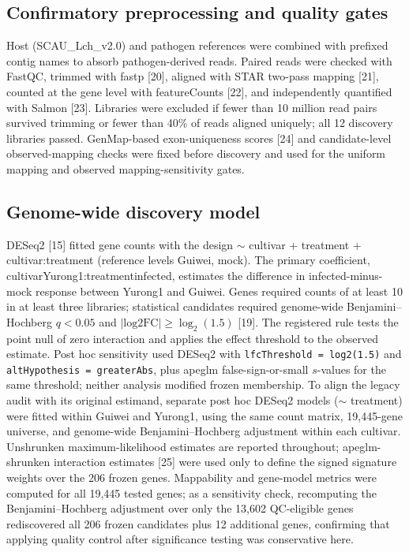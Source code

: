 \documentclass[11pt]{article}
\newcommand{\q}{\textit{q}}
\begin{document}
\subsection{Confirmatory preprocessing and quality gates}

Host (SCAU\_Lch\_v2.0) and pathogen references were combined with prefixed contig names to absorb pathogen-derived reads. Paired reads were checked with FastQC, trimmed with fastp [20], aligned with STAR two-pass mapping [21], counted at the gene level with featureCounts [22], and independently quantified with Salmon [23]. Libraries were excluded if fewer than 10 million read pairs survived trimming or fewer than 40\% of reads aligned uniquely; all 12 discovery libraries passed. GenMap-based exon-uniqueness scores [24] and candidate-level observed-mapping checks were fixed before discovery and used for the uniform mapping and observed mapping-sensitivity gates.

\subsection{Genome-wide discovery model}

DESeq2 [15] fitted gene counts with the design $\sim$ cultivar + treatment + cultivar:treatment (reference levels Guiwei, mock). The primary coefficient, cultivarYurong1:treatmentinfected, estimates the difference in infected-minus-mock response between Yurong1 and Guiwei. Genes required counts of at least 10 in at least three libraries; statistical candidates required genome-wide Benjamini--Hochberg $\q<0.05$ and $|\mathrm{log2FC}|\ge\log_2(1.5)$ [19]. The registered rule tests the point null of zero interaction and applies the effect threshold to the observed estimate. Post hoc sensitivity used DESeq2 with \texttt{lfcThreshold = log2(1.5)} and \texttt{altHypothesis = greaterAbs}, plus apeglm false-sign-or-small $s$-values for the same threshold; neither analysis modified frozen membership. To align the legacy audit with its original estimand, separate post hoc DESeq2 models ($\sim$ treatment) were fitted within Guiwei and Yurong1, using the same count matrix, 19,445-gene universe, and genome-wide Benjamini--Hochberg adjustment within each cultivar. Unshrunken maximum-likelihood estimates are reported throughout; apeglm-shrunken interaction estimates [25] were used only to define the signed signature weights over the 206 frozen genes. Mappability and gene-model metrics were computed for all 19,445 tested genes; as a sensitivity check, recomputing the Benjamini--Hochberg adjustment over only the 13,602 QC-eligible genes rediscovered all 206 frozen candidates plus 12 additional genes, confirming that applying quality control after significance testing was conservative here.
\end{document}

